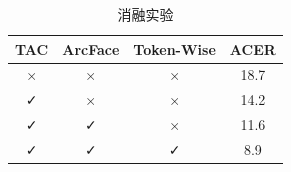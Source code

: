 \begin{table}[H]
\centering
\caption{消融实验}
\begin{tabular}{cccc}
\toprule
TAC & ArcFace & Token-Wise & ACER \\
\midrule
× & × & × & 18.7 \\
✓ & × & × & 14.2 \\
✓ & ✓ & × & 11.6 \\
✓ & ✓ & ✓ & 8.9 \\
\bottomrule
\end{tabular}
\label{tab:ablation}
\end{table}
